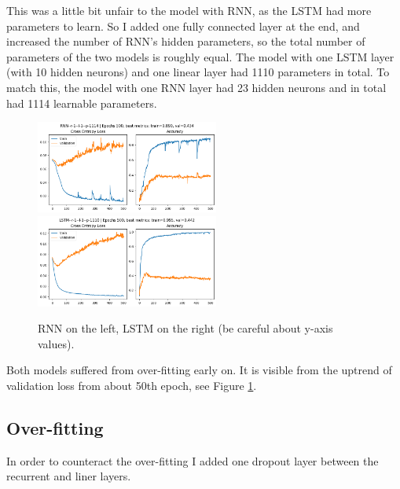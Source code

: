 \documentclass[a4paper,10pt]{article}
\begin{document}
This was a little bit unfair to the model with RNN, as the LSTM had more parameters to learn.
So I added one fully connected layer at the end, and increased the number of RNN's hidden parameters, so the total number of parameters of the two models is roughly equal.
The model with one LSTM layer (with 10 hidden neurons) and one linear layer had 1110 parameters in total.
To match this, the model with one RNN layer had 23 hidden neurons and in total had 1114 learnable parameters.

\begin{figure}[H]
      \begin{center}
            \includegraphics[width=6cm]{figures/RNN--r-1--l-1--p-1114--e-500.png}
            \includegraphics[width=6cm]{figures/LSTM--r-1--l-1--p-1110--e-500.png}
      \end{center}
      \caption{RNN on the left, LSTM on the right (be careful about y-axis values).}
      \label{fig2}
\end{figure}

Both models suffered from over-fitting early on. It is visible from the uptrend of validation loss from about 50th epoch, see Figure \ref{fig2}.

\subsection{Over-fitting}

In order to counteract the over-fitting I added one dropout layer between the recurrent and liner layers.
\end{document}
